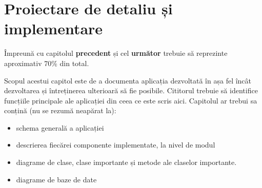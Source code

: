 \chapter{Proiectare de detaliu și implementare}
\pagestyle{fancy}

{\color{blue}Împreună cu capitolul \textbf{precedent} și cel \textbf{următor} trebuie să reprezinte aproximativ 70\% din total.\\}

Scopul acestui capitol este de a documenta aplicația dezvoltată în așa fel încât dezvoltarea și întreținerea ulterioară să fie posibile.
Cititorul trebuie să identifice funcțiile principale ale aplicației din ceea ce este scris aici.
Capitolul ar trebui sa conțină (nu se rezumă neapărat la):
\begin{itemize}
	\item schema generală a aplicației
	\item descrierea fiecărei componente implementate, la nivel de modul
	\item diagrame de clase, clase importante și metode ale claselor importante.
    \item diagrame de baze de date
\end{itemize}
